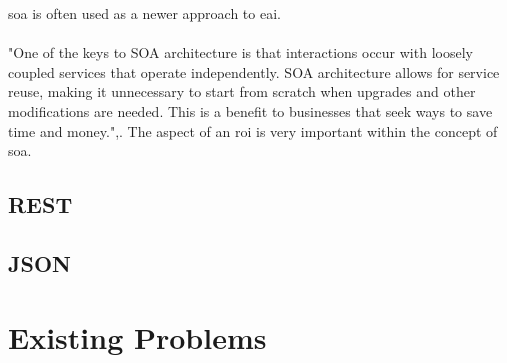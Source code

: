 \documentclass[12pt]{article}
\begin{document}
\gls{soa} is often used as a newer approach to \gls{eai}. \cite{soaitwissen}
\\ \\
"One of the keys to SOA architecture is that interactions occur with loosely coupled services that operate independently. SOA architecture allows for service reuse, making it unnecessary to start from scratch when upgrades and other modifications are needed. This is a benefit to businesses that seek ways to save time and money.",\cite{searchsoa}. The aspect of an \gls{roi} is very important within the concept of \gls{soa}.
\subsection{REST}
\subsection{JSON}

\section{Existing Problems}
\end{document}
